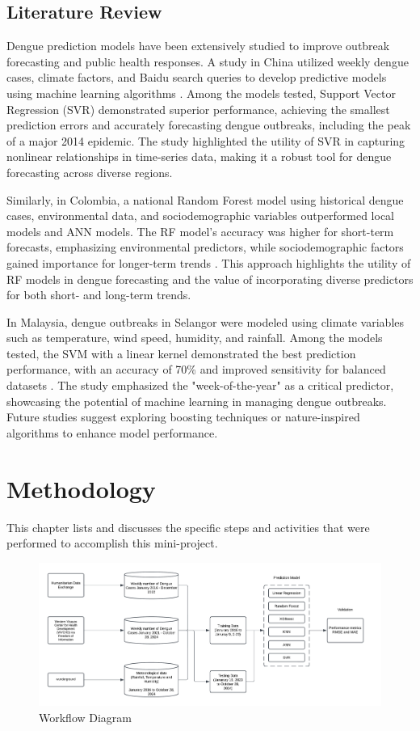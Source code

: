 \documentclass{article}
\begin{document}
\subsection{Literature Review}
Dengue prediction models have been extensively studied to improve outbreak forecasting and public health responses. A study in China utilized weekly dengue cases, climate factors, and Baidu search queries to develop predictive models using machine learning algorithms \cite{guo2017developing}. Among the models tested, Support Vector Regression (SVR) demonstrated superior performance, achieving the smallest prediction errors and accurately forecasting dengue outbreaks, including the peak of a major 2014 epidemic. The study highlighted the utility of SVR in capturing nonlinear relationships in time-series data, making it a robust tool for dengue forecasting across diverse regions.

Similarly, in Colombia, a national Random Forest model using historical dengue cases, environmental data, and sociodemographic variables outperformed local models and ANN models. The RF model's accuracy was higher for short-term forecasts, emphasizing environmental predictors, while sociodemographic factors gained importance for longer-term trends \cite{zhao2020machine}. This approach highlights the utility of RF models in dengue forecasting and the value of incorporating diverse predictors for both short- and long-term trends.

In Malaysia, dengue outbreaks in Selangor were modeled using climate variables such as temperature, wind speed, humidity, and rainfall. Among the models tested, the SVM with a linear kernel demonstrated the best prediction performance, with an accuracy of 70\% and improved sensitivity for balanced datasets \cite{salim2021prediction}. The study emphasized the "week-of-the-year" as a critical predictor, showcasing the potential of machine learning in managing dengue outbreaks. Future studies suggest exploring boosting techniques or nature-inspired algorithms to enhance model performance.

\section{Methodology}
This chapter lists and discusses the specific steps and activities that were performed to accomplish this mini-project.

\begin{figure}[h!]
    \centering
    \includegraphics[width=1\linewidth]{image/Model Diagram.png}
    \caption{Workflow Diagram}
    \label{fig:workflow}
\end{figure}
\end{document}
